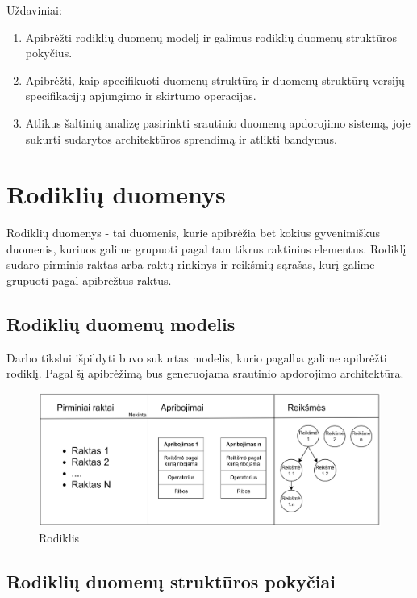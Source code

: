 \documentclass{VUMIFPSbakalaurinis}
\begin{document}
Uždaviniai:
\begin{enumerate}
    \item Apibrėžti rodiklių duomenų modelį ir galimus rodiklių duomenų struktūros pokyčius.
    \item Apibrėžti, kaip specifikuoti duomenų struktūrą ir duomenų struktūrų versijų specifikacijų apjungimo ir skirtumo operacijas.
    \item Atlikus šaltinių analizę pasirinkti srautinio duomenų apdorojimo sistemą, joje sukurti sudarytos architektūros sprendimą ir atlikti bandymus.
\end{enumerate}

\section{Rodiklių duomenys}

Rodiklių duomenys - tai duomenis, kurie apibrėžia bet kokius gyvenimiškus duomenis, kuriuos galime grupuoti pagal tam tikrus raktinius elementus. Rodiklį sudaro pirminis raktas arba raktų rinkinys ir reikšmių sąrašas, kurį galime grupuoti pagal apibrėžtus raktus.      

\subsection{Rodiklių duomenų modelis}

Darbo tikslui išpildyti buvo sukurtas modelis, kurio pagalba galime apibrėžti rodiklį. Pagal šį apibrėžimą bus generuojama srautinio apdorojimo architektūra.

\begin{figure}[H]
    \centering
    \includegraphics[width=1\textwidth]{img/Rodiklis}
    \caption{Rodiklis}
    \label{img:rodiklis}
\end{figure}


\subsection{Rodiklių duomenų struktūros pokyčiai}
\end{document}

